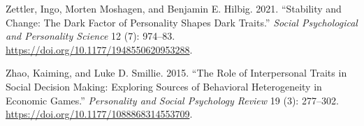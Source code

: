\documentclass[
]{article}
\newlength{\cslhangindent}
\newenvironment{CSLReferences}[2] %
 {\begin{list}{}{%
  \setlength{\itemindent}{0pt}
  \setlength{\leftmargin}{0pt}
  \setlength{\parsep}{0pt}
  \ifodd #1
   \setlength{\leftmargin}{\cslhangindent}
   \setlength{\itemindent}{-1\cslhangindent}
  \fi
  \setlength{\itemsep}{#2\baselineskip}}}
 {\end{list}}
\begin{document}
\begin{CSLReferences}{1}{0}
Zettler, Ingo, Morten Moshagen, and Benjamin E. Hilbig. 2021. {``Stability and Change: {The} {Dark Factor of Personality} Shapes Dark Traits.''} \emph{Social Psychological and Personality Science} 12 (7): 974--83. \url{https://doi.org/10.1177/1948550620953288}.

Zhao, Kaiming, and Luke D. Smillie. 2015. {``The Role of Interpersonal Traits in Social Decision Making: {Exploring} Sources of Behavioral Heterogeneity in Economic Games.''} \emph{Personality and Social Psychology Review} 19 (3): 277--302. \url{https://doi.org/10.1177/1088868314553709}.

\end{CSLReferences}
\end{document}
